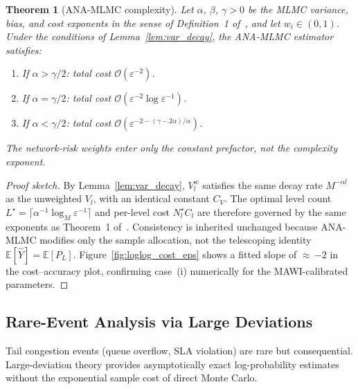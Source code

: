 \documentclass{ieeeaccess}
\newtheorem{theorem}{Theorem}
\begin{document}
\begin{theorem}[ANA-MLMC complexity]
\label{thm:complexity}
Let $\alpha$, $\beta$, $\gamma > 0$ be the MLMC variance, bias, and cost exponents in the
sense of Definition~1 of~\cite{giles2015multilevel}, and let $w_i \in (0,1)$.
Under the conditions of Lemma~\ref{lem:var_decay}, the ANA-MLMC estimator satisfies:
\begin{enumerate}
  \item[{\rm (i)}] If $\alpha > \gamma/2$: total cost $\mathcal{O}(\varepsilon^{-2})$.
  \item[{\rm (ii)}] If $\alpha = \gamma/2$: total cost $\mathcal{O}(\varepsilon^{-2}\log\varepsilon^{-1})$.
  \item[{\rm (iii)}] If $\alpha < \gamma/2$: total cost
    $\mathcal{O}\!\left(\varepsilon^{-2-(\gamma-2\alpha)/\alpha}\right)$.
\end{enumerate}
The network-risk weights enter only the constant prefactor, not the complexity exponent.
\end{theorem}
\begin{proof}[Proof sketch]
By Lemma~\ref{lem:var_decay}, $V_l^w$ satisfies the same decay rate $M^{-\alpha l}$ as the
unweighted $V_l$, with an identical constant $C_V$.  The optimal level count
$L^{\star} = \lceil \alpha^{-1} \log_M \varepsilon^{-1} \rceil$ and per-level cost
$N_l^{\star} C_l$ are therefore governed by the same exponents as Theorem~1
of~\cite{giles2015multilevel}.  Consistency is inherited unchanged because ANA-MLMC modifies
only the sample allocation, not the telescoping identity
$\mathbb{E}[\hat Y] = \mathbb{E}[P_L]$.
Figure~\ref{fig:loglog_cost_eps} shows a fitted slope of ${\approx}\,{-2}$ in the
cost--accuracy plot, confirming case~(i) numerically for the MAWI-calibrated parameters.
\end{proof}

\subsection{Rare-Event Analysis via Large Deviations}
\label{subsec:rare_event}

Tail congestion events (queue overflow, SLA violation) are rare but consequential.
Large-deviation theory provides asymptotically exact log-probability estimates without
the exponential sample cost of direct Monte Carlo.
\end{document}

